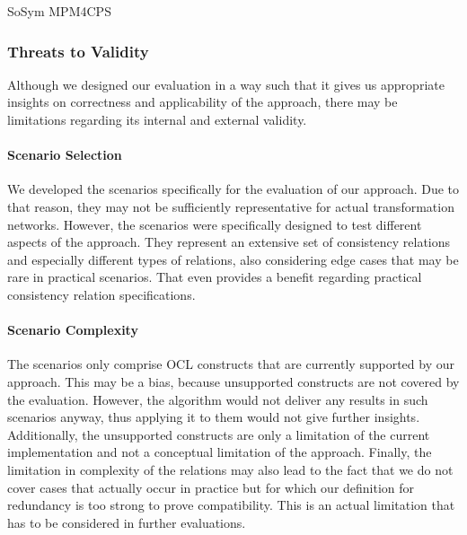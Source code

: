 \begin{copiedFrom}{SoSym MPM4CPS}


\subsubsection{Threats to Validity}

Although we designed our evaluation in a way such that it gives us appropriate insights on correctness and applicability of the approach, there may be limitations regarding its internal and external validity. %

\paragraph{Scenario Selection}
We developed the scenarios specifically for the evaluation of our approach.
Due to that reason, they may not be sufficiently representative for actual transformation networks. 
However, the scenarios were specifically designed to test different aspects of the approach.
They represent an extensive set of consistency relations and especially different types of relations, also considering edge cases that may be rare in practical scenarios.
That even provides a benefit regarding practical consistency relation specifications.

\paragraph{Scenario Complexity}
The scenarios only comprise OCL constructs that are currently supported by our approach.
This may be a bias, because unsupported constructs are not covered by the evaluation.
However, the algorithm would not deliver any results in such scenarios anyway, thus applying it to them would not give further insights.
Additionally, the unsupported constructs are only a limitation of the current implementation and not a conceptual limitation of the approach.
Finally, the limitation in complexity of the relations may also lead to the fact that we do not cover cases that actually occur in practice but for which our definition for redundancy is too strong to prove compatibility.
This is an actual limitation that has to be considered in further evaluations.


\end{copiedFrom}
